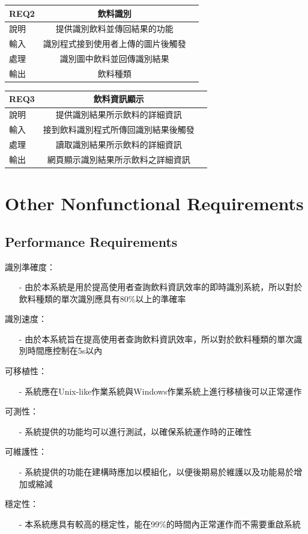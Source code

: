 \documentclass{scrreprt}
\begin{document}
\begin{CJK}{UTF8}{bkai}
\begin{center}
\begin{tabular}{|l|c|r|}\hline
REQ2 & 飲料識別\\ \hline
說明 & 提供識別飲料並傳回結果的功能\\ \hline
輸入 & 識別程式接到使用者上傳的圖片後觸發\\ \hline
處理 & 識別圖中飲料並回傳識別結果\\ \hline
輸出 & 飲料種類\\ \hline
\end{tabular}
\end{center}

\begin{center}
\begin{tabular}{|l|c|r|}\hline
REQ3 & 飲料資訊顯示\\ \hline
說明 & 提供識別結果所示飲料的詳細資訊\\ \hline
輸入 & 接到飲料識別程式所傳回識別結果後觸發\\ \hline
處理 & 讀取識別結果所示飲料的詳細資訊\\ \hline
輸出 & 網頁顯示識別結果所示飲料之詳細資訊\\ \hline
\end{tabular}
\end{center}


\chapter{Other Nonfunctional Requirements}

\section{Performance Requirements}
識別準確度：
\begin{itemize}
\item[-] 由於本系統是用於提高使用者查詢飲料資訊效率的即時識別系統，所以對於飲料種類的單次識別應具有80\%以上的準確率
\end{itemize}
識別速度：
\begin{itemize}
\item[-] 由於本系統旨在提高使用者查詢飲料資訊效率，所以對於飲料種類的單次識別時間應控制在5s以內
\end{itemize}
可移植性：
\begin{itemize}
\item[-] 系統應在Unix-like作業系統與Windows作業系統上進行移植後可以正常運作
\end{itemize}
可測性：
\begin{itemize}
\item[-] 系統提供的功能均可以進行測試，以確保系統運作時的正確性
\end{itemize}
可維護性：
\begin{itemize}
\item[-] 系統提供的功能在建構時應加以模組化，以便後期易於維護以及功能易於增加或縮減
\end{itemize}
穩定性：
\begin{itemize}
\item[-] 本系統應具有較高的穩定性，能在99\%的時間內正常運作而不需要重啟系統
\end{itemize}



\end{CJK}
\end{document}
